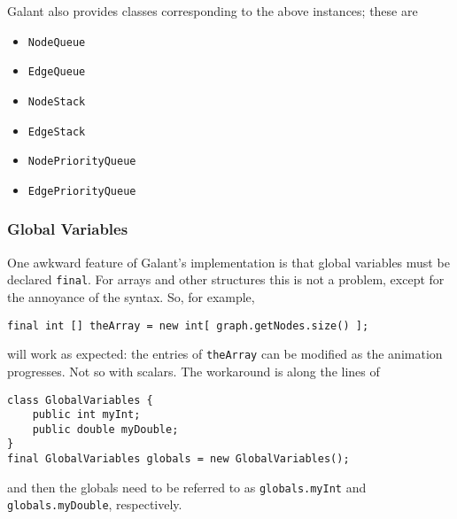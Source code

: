 Galant also provides classes corresponding to the above instances; these are
\begin{itemize}
  \item \texttt{NodeQueue}
  \item \texttt{EdgeQueue}
  \item \texttt{NodeStack}
  \item \texttt{EdgeStack}
  \item \texttt{NodePriorityQueue}
  \item \texttt{EdgePriorityQueue}
\end{itemize}

\subsubsection*{Global Variables}

One awkward feature of Galant's implementation is that global variables
must be declared \texttt{final}. For arrays and other structures this is not
a problem, except for the annoyance of the syntax. So, for example,
\begin{verbatim}
final int [] theArray = new int[ graph.getNodes.size() ];
\end{verbatim}
will work as expected: the entries of \verb+theArray+ can be modified as the animation progresses.
Not so with scalars. The workaround is along the lines of
\begin{verbatim}
class GlobalVariables {
    public int myInt;
    public double myDouble;
}
final GlobalVariables globals = new GlobalVariables();
\end{verbatim}
and then the globals need to be referred to as \verb+globals.myInt+
and \verb+globals.myDouble+, respectively.

